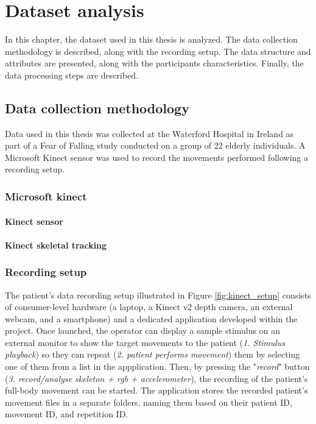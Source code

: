 %
%
\hypersetup{colorlinks=true, linkcolor=blue, citecolor=red}
\chapter{Dataset analysis} \label{chap:dataset_analysis}
    In this chapter, the dataset used in this thesis is analyzed. The data collection methodology is described, along with the recording setup. The data structure and attributes are presented, along with the participants characteristics. Finally, the data processing steps are described.

    \section{Data collection methodology}
        Data used in this thesis was collected at the Waterford Hospital in Ireland as part of a Fear of Falling study conducted on a group of 22 elderly individuals.  A Microsoft Kinect sensor was used to record the movements performed following a recording setup. 
        \subsection{Microsoft kinect}
                    \subsubsection{Kinect sensor} 

                    \subsubsection{Kinect skeletal tracking}
        \newpage

        \subsection{Recording setup}

                    The patient's data recording setup illustrated in Figure \ref{fig:kinect_setup} consists of consumer-level hardware (a laptop, a Kinect v2 depth camera, an external webcam, and a smartphone) and a dedicated application developed within the project. 
                    Once launched, the operator can display a sample stimulus on an external monitor to show the target movements to the patient (\textit{1. Stimulus playback}) so they can repeat (\textit{2. patient performs movement}) them by selecting one of them from a list in the appplication.
                    Then, by pressing the "\textit{record}" button (\textit{3. record/analyse skeleton + rgb + accelerometer}), the recording of the patient's full-body movement can be started. 
                    The application stores the recorded patient's movement files in a separate folders, naming them based on their patient ID, movement ID, and repetition ID.

